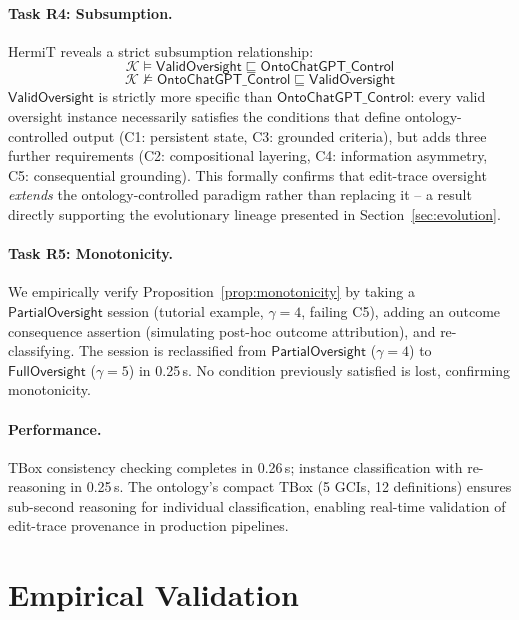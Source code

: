 \documentclass[11pt]{article}
\newcommand{\KB}{\ensuremath{\mathcal{K}}\xspace}
\newcommand{\sqsub}{\sqsubseteq}
\begin{document}
\paragraph{Task R4: Subsumption.}
HermiT reveals a strict subsumption relationship:
\begin{equation}
  \KB \models \mathsf{ValidOversight} \sqsub \mathsf{OntoChatGPT\_Control}
\end{equation}
\begin{equation}
  \KB \not\models \mathsf{OntoChatGPT\_Control} \sqsub \mathsf{ValidOversight}
\end{equation}
$\mathsf{ValidOversight}$ is strictly more specific than $\mathsf{OntoChatGPT\_Control}$: every valid oversight instance necessarily satisfies the conditions that define ontology-controlled output (C1: persistent state, C3: grounded criteria), but adds three further requirements (C2: compositional layering, C4: information asymmetry, C5: consequential grounding).
This formally confirms that edit-trace oversight \emph{extends} the ontology-controlled paradigm rather than replacing it -- a result directly supporting the evolutionary lineage presented in Section~\ref{sec:evolution}.

\paragraph{Task R5: Monotonicity.}
We empirically verify Proposition~\ref{prop:monotonicity} by taking a $\mathsf{PartialOversight}$ session (tutorial example, $\gamma = 4$, failing C5), adding an outcome consequence assertion (simulating post-hoc outcome attribution), and re-classifying.
The session is reclassified from $\mathsf{PartialOversight}$ ($\gamma = 4$) to $\mathsf{FullOversight}$ ($\gamma = 5$) in 0.25\,s.
No condition previously satisfied is lost, confirming monotonicity.

\paragraph{Performance.}
TBox consistency checking completes in 0.26\,s; instance classification with re-reasoning in 0.25\,s.
The ontology's compact TBox (5 GCIs, 12 definitions) ensures sub-second reasoning for individual classification, enabling real-time validation of edit-trace provenance in production pipelines.


\section{Empirical Validation}
\label{sec:empirical}
\end{document}
